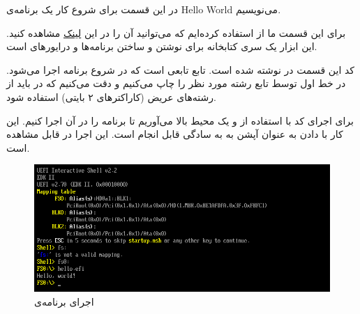 

در این قسمت برای شروع کار یک برنامه‌ی Hello World می‌نویسیم.


برای این قسمت ما از  استفاده کرده‌ایم که می‌توانید آن را در این \href{https://github.com/tianocore/edk2}{لینک} مشاهده کنید. این ابزار یک سری کتابخانه برای نوشتن و ساختن برنامه‌ها و درایورهای  است.


کد این قسمت در  نوشته شده است. تابع  تابعی است که در شروع برنامه اجرا می‌شود. در خط اول توسط تابع  رشته مورد نظر را چاپ می‌کنیم و دقت می‌کنیم که در  باید از رشته‌های عریض (کاراکترهای ۲ بایتی) استفاده شود.

برای اجرای کد با استفاده از  و  یک محیط  بالا می‌آوریم تا برنامه را در آن اجرا کنیم. این کار با دادن  به عنوان آپشن  به  به سادگی قابل انجام است. این اجرا در  قابل مشاهده است.
\begin{figure}
	\centering
	\includegraphics[width=0.7\linewidth]{figs/helloworld/helloworld1}
	\caption{اجرای برنامه‌ی }
	\label{fig:helloworld1}
\end{figure}
